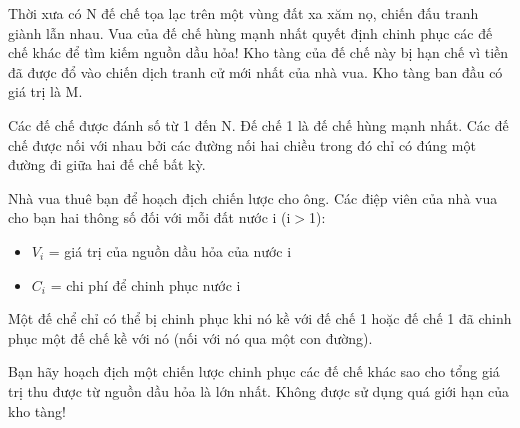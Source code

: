Thời xưa có N đế chế tọa lạc trên một vùng đất xa xăm nọ, chiến đấu tranh giành lẫn nhau. Vua của đế chế hùng mạnh nhất quyết định chinh phục các đế chế khác để tìm kiếm nguồn dầu hỏa! Kho tàng của đế chế này bị hạn chế vì tiền đã được đổ vào chiến dịch tranh cử mới nhất của nhà vua. Kho tàng ban đầu có giá trị là M.

Các đế chế được đánh số từ 1 đến N. Đế chế 1 là đế chế hùng mạnh nhất. Các đế chế được nối với nhau bởi các đường nối hai chiều trong đó chỉ có đúng một đường đi giữa hai đế chế bất kỳ.

Nhà vua thuê bạn để hoạch địch chiến lược cho ông. Các điệp viên của nhà vua cho bạn hai thông số đối với mỗi đất nước i (i$>$1):
\begin{itemize}
	\item $V_{i}$ = giá trị của nguồn dầu hỏa của nước i
	\item $C_{i}$ = chi phí để chinh phục nước i
\end{itemize}

Một đế chể chỉ có thể bị chinh phục khi nó kề với đế chế 1 hoặc đế chế 1 đã chinh phục một đế chế kề với nó (nối với nó qua một con đường).

Bạn hãy hoạch địch một chiến lược chinh phục các đế chế khác sao cho tổng giá trị thu được từ nguồn dầu hỏa là lớn nhất. Không được sử dụng quá giới hạn của kho tàng!